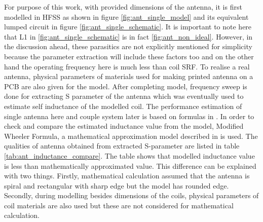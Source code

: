\documentclass[12pt,a4paper,UKenglish]{article}
\begin{document}
For purpose of this work, with provided dimensions of the antenna, it is first modelled in HFSS as shown in 
figure \ref{fig:ant_single_model} and its equivalent lumped circuit in figure \ref{fig:ant_single_schematic}. It is important to 
note here that L1 in \ref{fig:ant_single_schematic} is in fact \ref{fig:ant_non_ideal}. However, in the discussion ahead, these 
parasitics are not explicitly mentioned for simplicity because the parameter extraction will include these factors too and on the other hand the operating frequency here is much less than coil SRF. To realise a real antenna, physical parameters of materials used for making 
printed antenna on a PCB are also given for the model.  After completing model, frequency sweep is done for extracting S parameter of the 
antenna which was eventually used to estimate  self inductance of the modelled coil. The performance estimation of 
single antenna here and couple system later is based on formulas in \cite{ant_SZ_formula}. In order to check and compare the estimated inductance value from 
the model, Modified Wheeler Formula, a mathematical approximation model described in \cite{ant_inductance_calculation} is used. The 
qualities of antenna obtained from extracted S-parameter are listed in table \ref{tab:ant_inductance_compare}. The table shows that 
modelled inductance value is less than mathematically approximated value. This difference can be explained with two things. 
Firstly, mathematical calculation assumed that the antenna is spiral and rectangular with sharp edge but the model has 
rounded edge. Secondly, during modelling besides dimensions of the coils, physical parameters of coil materials are also used 
but these are not considered for mathematical calculation.\\
\end{document}
